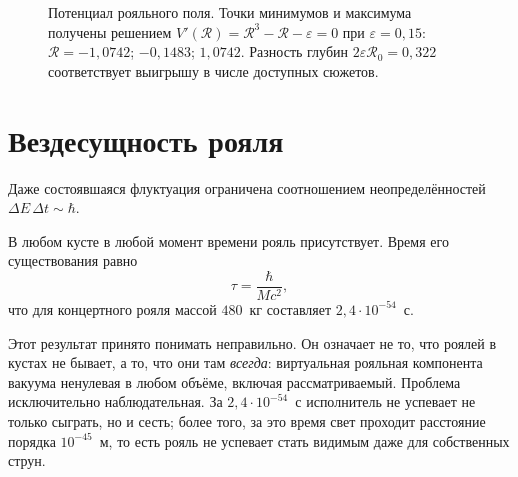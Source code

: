 \documentclass[11pt,a4paper]{article}
\newcommand{\Rfield}{\mathcal{R}}
\begin{document}
\begin{figure}[htbp]
\centering
{}
\caption{Потенциал рояльного поля. Точки минимумов и максимума получены решением $V'(\Rfield)=\Rfield^3-\Rfield-\varepsilon=0$ при $\varepsilon=0{,}15$: $\Rfield=-1{,}0742$; $-0{,}1483$; $1{,}0742$. Разность глубин $2\varepsilon\Rfield_0 = 0{,}322$ соответствует выигрышу в числе доступных сюжетов.}
\label{fig:potential}
\end{figure}

\section{Вездесущность рояля}

Даже состоявшаяся флуктуация ограничена соотношением неопределённостей $\Delta E\,\Delta t\sim\hbar$.

\begin{theorem}
В любом кусте в любой момент времени рояль присутствует. Время его существования равно
\[
\tau = \frac{\hbar}{Mc^2},
\]
что для концертного рояля массой $480$~кг составляет $2{,}4\cdot10^{-54}$~с.
\end{theorem}

Этот результат принято понимать неправильно. Он означает не то, что роялей в кустах не бывает, а то, что они там \emph{всегда}: виртуальная рояльная компонента вакуума ненулевая в любом объёме, включая рассматриваемый. Проблема исключительно наблюдательная. За $2{,}4\cdot10^{-54}$~с исполнитель не успевает не только сыграть, но и сесть; более того, за это время свет проходит расстояние порядка $10^{-45}$~м, то есть рояль не успевает стать видимым даже для собственных струн.
\end{document}
